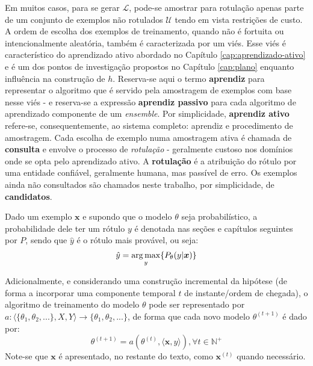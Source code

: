 Em muitos casos, para se gerar $\mathcal{L}$, pode-se amostrar para rotulação apenas parte de um conjunto de exemplos não rotulados $\mathcal{U}$ tendo em vista restrições de custo.
A ordem de escolha dos exemplos de treinamento, quando não é fortuita ou intencionalmente aleatória, também é caracterizada por um viés.
Esse viés é característico do aprendizado ativo abordado no Capítulo \ref{cap:aprendizado-ativo} e é um dos pontos de investigação propostos no Capítulo \ref{cap:plano} enquanto influência na construção de $h$.
Reserva-se aqui o termo \textbf{aprendiz} para representar o algoritmo que é servido pela amostragem de exemplos com base nesse viés - e reserva-se a expressão \textbf{aprendiz passivo} para cada algoritmo de aprendizado componente de um \textit{ensemble}.
Por simplicidade, \textbf{aprendiz ativo} refere-se, consequentemente, ao sistema completo: aprendiz e procedimento de amostragem.
Cada escolha de exemplo numa amostragem ativa é chamada de \textbf{consulta} e envolve o processo de \textit{rotulação} - geralmente custoso nos domínios onde se opta pelo aprendizado ativo.
A \textbf{rotulação} é a atribuição do rótulo por uma entidade confiável, geralmente humana, mas passível de erro.
Os exemplos ainda não consultados são chamados neste trabalho, por simplicidade, de \textbf{candidatos}.


%
%


Dado um exemplo $\bm{x}$ e supondo que o modelo $\theta$ seja probabilístico, a probabilidade dele ter um rótulo $y$ é denotada nas seções e capítulos seguintes por $P$,
sendo que $\hat{y}$ é o rótulo mais provável, ou seja:
\begin{equation}
  \hat{y} = \operatorname*{arg\,max}_y\{ P_{\theta} (y|\bm{x})\}
\end{equation}

Adicionalmente, e considerando uma construção incremental da hipótese
(de forma a incorporar uma componente temporal $t$ de instante/ordem de chegada),
o algoritmo de treinamento do modelo $\theta$ pode ser representado por
$a: \langle \{\theta_1, \theta_2, ...\},X,Y \rangle \rightarrow \{\theta_1, \theta_2, ...\}$, de forma que cada novo modelo $\theta^{(t+1)}$ é dado por:
\begin{equation}
  \theta^{(t+1)} = a(\theta^{(t)}, \langle \bm{x},y \rangle), \forall t \in \mathbb{N^{+}}
\end{equation}
Note-se que $\bm{x}$ é apresentado, no restante do texto, como $\bm{x}^{(t)}$ quando necessário.
